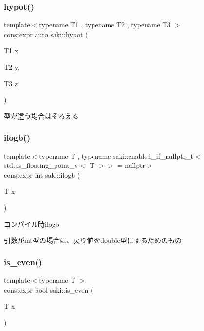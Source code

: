 \subsubsection{\texorpdfstring{hypot()}{hypot()}\hspace{0.1cm}{\footnotesize\ttfamily [6/6]}}
{\footnotesize\ttfamily template$<$typename T1 , typename T2 , typename T3 $>$ \\
constexpr auto saki\+::hypot (\begin{DoxyParamCaption}\item[{T1}]{x,  }\item[{T2}]{y,  }\item[{T3}]{z }\end{DoxyParamCaption})}



型が違う場合はそろえる 

\mbox{\label{namespacesaki_a582e9de82aa8572287c01530ae2626a8}} 
\subsubsection{\texorpdfstring{ilogb()}{ilogb()}}
{\footnotesize\ttfamily template$<$typename T , typename saki\+::enabled\+\_\+if\+\_\+nullptr\+\_\+t$<$ std\+::is\+\_\+floating\+\_\+point\+\_\+v$<$ T $>$$>$  = nullptr$>$ \\
constexpr int saki\+::ilogb (\begin{DoxyParamCaption}\item[{T}]{x }\end{DoxyParamCaption})}



コンパイル時ilogb 

引数がint型の場合に、戻り値をdouble型にするためのもの \mbox{\label{namespacesaki_a7fa7e4ec89e948874e42926e91d6dd4e}} 
\subsubsection{\texorpdfstring{is\+\_\+even()}{is\_even()}}
{\footnotesize\ttfamily template$<$typename T $>$ \\
constexpr bool saki\+::is\+\_\+even (\begin{DoxyParamCaption}\item[{T}]{x }\end{DoxyParamCaption})}



